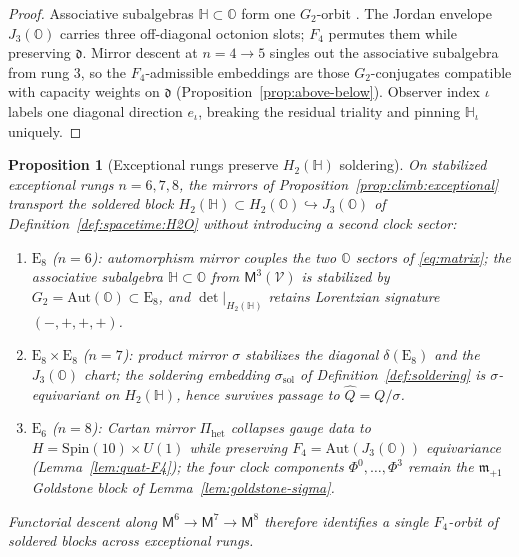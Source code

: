 \documentclass[11pt]{article}
\theoremstyle{plain}
\newtheorem{proposition}[theorem]{Proposition}
\theoremstyle{definition}
\theoremstyle{remark}
\numberwithin{equation}{section}
\newcommand{\Quat}{\mathbb{H}}
\newcommand{\Oct}{\mathbb{O}}
\newcommand{\jalg}{J_3(\mathbb{O})}
\newcommand{\E}[1]{\mathrm{E}_{#1}}
\newcommand{\Spin}{\mathrm{Spin}}
\newcommand{\Void}{\mathcal{V}}
\newcommand{\Mirror}{\mathsf{M}}
\newcommand{\orderparam}{\Phi}
\begin{document}
\begin{proof}
Associative subalgebras $\Quat\subset\Oct$ form one $G_2$-orbit
\cite{SpringerVeldkamp2000}. The Jordan envelope $\jalg$ carries three
off-diagonal octonion slots; $F_4$ permutes them while preserving
$\mathfrak{d}$. Mirror descent at $n=4\to5$ singles out the associative
subalgebra from rung $3$, so the $F_4$-admissible embeddings are those
$G_2$-conjugates compatible with capacity weights on $\mathfrak{d}$
(Proposition~\ref{prop:above-below}). Observer index $\iota$ labels one
diagonal direction $e_\iota$, breaking the residual triality and pinning
$\Quat_\iota$ uniquely.
\end{proof}

\begin{proposition}[Exceptional rungs preserve $H_2(\Quat)$ soldering]
\label{prop:soldering-transport}
On stabilized exceptional rungs $n=6,7,8$, the mirrors of
Proposition~\ref{prop:climb:exceptional} transport the soldered block
$H_2(\Quat)\subset H_2(\Oct)\hookrightarrow\jalg$ of
Definition~\ref{def:spacetime:H2O} without introducing a second clock sector:
\begin{enumerate}[label=(\roman*),leftmargin=*]
  \item $\E{8}$ ($n=6$): automorphism mirror couples the two $\Oct$ sectors of
    \eqref{eq:matrix}; the associative subalgebra $\Quat\subset\Oct$ from
    $\Mirror^3(\Void)$ is stabilized by $G_2=\mathrm{Aut}(\Oct)\subset\E{8}$,
    and $\det|_{H_2(\Quat)}$ retains Lorentzian signature $(-,+,+,+)$.
  \item $\E{8}\times\E{8}$ ($n=7$): product mirror $\sigma$ stabilizes the
    diagonal $\delta(\E{8})$ and the $\jalg$ chart; the soldering embedding
    $\sigma_{\mathrm{sol}}$ of Definition~\ref{def:soldering} is
    $\sigma$-equivariant on $H_2(\Quat)$, hence survives passage to
    $\hat Q=Q/\sigma$.
  \item $\E{6}$ ($n=8$): Cartan mirror $\Pi_{\mathrm{het}}$ collapses gauge data
    to $H=\Spin(10)\times U(1)$ while preserving $F_4=\mathrm{Aut}(\jalg)$
    equivariance (Lemma~\ref{lem:quat-F4}); the four clock components
    $\orderparam^0,\ldots,\orderparam^3$ remain the $\mathfrak{m}_{+1}$
    Goldstone block of Lemma~\ref{lem:goldstone-sigma}.
\end{enumerate}
Functorial descent along $\Mirror^6\to\Mirror^7\to\Mirror^8$ therefore
identifies a single $F_4$-orbit of soldered blocks across exceptional rungs.
\end{proposition}
\end{document}
